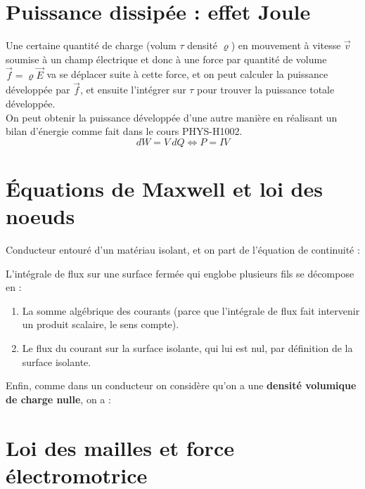 \documentclass[12pt]{book}
\begin{document}
\section{Puissance dissipée : effet Joule}
Une certaine quantité de charge (volum $\tau$ densité $\varrho$) en mouvement à vitesse $\vec{v}$ soumise à un champ électrique et donc à une force par quantité de volume $\vec{f} = \varrho \vec{E}$ va se déplacer suite à cette force, et on peut calculer la puissance développée par $\vec{f}$, et ensuite l'intégrer sur $\tau$ pour trouver la puissance totale développée. \\

On peut obtenir la puissance développée d'une autre manière en réalisant un bilan d'énergie comme fait dans le cours PHYS-H1002. $$dW = V \ dQ \iff P = IV$$

\section{Équations de Maxwell et loi des noeuds}
Conducteur entouré d'un matériau isolant, et on part de l'équation de continuité :


L'intégrale de flux sur une surface fermée qui englobe plusieurs fils se décompose en : 
\begin{enumerate}
\item La somme algébrique des courants (parce que l'intégrale de flux fait intervenir un produit scalaire, le sens compte).
\item Le flux du courant sur la surface isolante, qui lui est nul, par définition de la surface isolante.
\end{enumerate}
Enfin, comme dans un conducteur on considère qu'on a une \textbf{densité volumique de charge nulle}, on a :

\section{Loi des mailles et force électromotrice}
\end{document}
